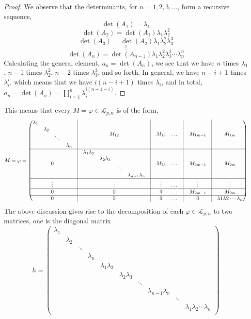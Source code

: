 \documentclass[12pt]{article}
\begin{document}
\begin{proof}
We observe that the determinants, for $n=1,2,3,\dots$, form a recursive sequence, $$
\det(A_1)=\lambda_1$$
$$\det(A_2)=\det(A_1)\lambda_1\lambda_2^2$$
$$\det(A_3)=\det(A_2)\lambda_1\lambda_2^2\lambda_3^3$$
$$\vdots$$
$$\det(A_n)=\det(A_{n-1})\lambda_1\lambda_2^2\lambda_3^3\cdots\lambda_n^n$$
Calculating the general element, $a_n=\det(A_n)$, we see that we have $n$ times $\lambda_1$, $n-1$ times $\lambda_2^2$, $n-2$ times $\lambda_3^3$, and so forth. In general, we have $n-i+1$ times $\lambda_i^i$, which means that we have $i(n-i+1)$ times $\lambda_i$, and in total, $a_n=\det(A_n)=\prod_{i=1}^n\lambda_i^{i(n+1-i)}$.
\end{proof}
This means that every $M=\varphi\in\mathcal{L}_{p,n}$ is of the form,$$M=\varphi=\begin{pmatrix}
\begin{matrix}\lambda_1 & & &\\
& \lambda_2 & &\\
& & \ddots &\\
& & & \lambda_n\\
\end{matrix} & \vline & M_{12}&\vline & M_{13} & \dots& \vline & M_{1m-1} & \vline&M_{1m}\\
\hline
0 & \vline & \begin{matrix}\lambda_1\lambda_2 & & &\\
& \lambda_2\lambda_3 & &\\
& & \ddots &\\
& & & \lambda_{n-1}\lambda_n\\
\end{matrix}&\vline & M_{23} & \dots &\vline & M_{2m-1} &\vline& M_{2m}\\
\hline
\vdots & \vline & \vdots&\vline & \vdots & \dots &\vline & \vdots &\vline& \vdots\\
\hline
0 & \vline & 0&\vline & 0 & \dots &\vline & M_{2m-1} &\vline& M_{2m}\\
\hline
0 & \vline & 0 &\vline & 0 & \dots &\vline & 0 &\vline& \lambda1\lambda2\cdots\lambda_n\\
\end{pmatrix}$$
The above discussion gives rise to the decomposition of each $\varphi\in\mathcal{L}_{p,n}$ to two matrices, one is the diagonal matrix $$h=\begin{pmatrix}
\lambda_1 & & & & & & & &\\
& \lambda_2 & & & & & & &\\
& & \ddots & & & & & &\\
& & & \lambda_n & & & & &\\
& & & & \lambda_1\lambda_2 & & & &\\
& & & & & \lambda_2\lambda_3 & & &\\
& & & & & & \ddots & &\\
& & & & & & & \lambda_{n-1}\lambda_n & &\\
& & & & & & & & \ddots &\\
& & & & & & & & & \lambda_1\lambda_2\cdots\lambda_n\\
\end{pmatrix}
$$
\end{document}
